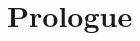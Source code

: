 
\chapter{Prologue} %

\label{Chapter1} %


\newcommand{\keyword}[1]{\textbf{#1}}
\newcommand{\tabhead}[1]{\textbf{#1}}
\newcommand{\code}[1]{\texttt{#1}}
\newcommand{\file}[1]{\texttt{\bfseries#1}}
\newcommand{\option}[1]{\texttt{\itshape#1}}








